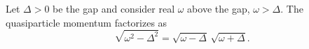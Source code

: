 \documentclass{article}
\begin{document}
Let $\Delta>0$ be the gap and consider real $\omega$ above the gap, $\omega>\Delta$. The quasiparticle
momentum factorizes as
\begin{equation}
\sqrt{\omega^2-\Delta^2} = \sqrt{\omega-\Delta}\,\sqrt{\omega+\Delta} .
\label{eq:k}
\end{equation}
\end{document}
